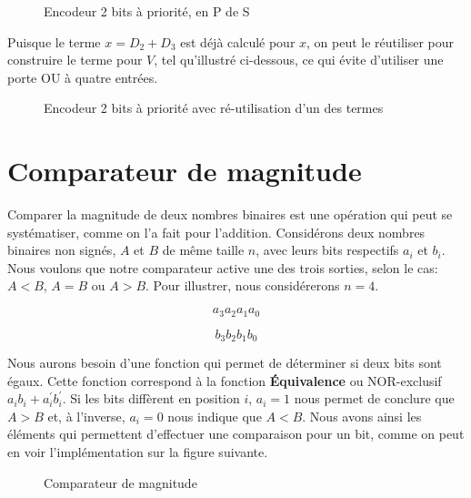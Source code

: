 \documentclass[letter, oneside]{book}
\begin{document}
\begin{enumerate}
\begin{figure}[htbp]
\centering

\caption{\label{fig:org0296f03}Encodeur 2 bits à priorité, en P de S}
\end{figure}

Puisque le terme \(x = D_2 + D_3\) est déjà calculé pour \(x\), on
peut le réutiliser pour construire le terme pour \(V\), tel
qu'illustré ci-dessous, ce qui évite d'utiliser une porte OU à quatre
entrées.

\begin{figure}[htbp]
\centering

\caption{\label{fig:orgd68beb9}Encodeur 2 bits à priorité avec ré-utilisation d'un des termes}
\end{figure}
\end{enumerate}


\section{Comparateur de magnitude}
\label{sec:org3540ce5}

Comparer la magnitude de deux nombres binaires est une opération qui
peut se systématiser, comme on l'a fait pour l'addition. Considérons
deux nombres binaires non signés, \(A\) et \(B\) de même taille \(n\),
avec leurs bits respectifs \(a_i\) et \(b_i\). Nous voulons que notre
comparateur active une des trois sorties, selon le cas: \(A < B\), \(A
= B\) ou \(A > B\). Pour illustrer, nous considérerons \(n = 4\).

$$ a_3 a_2 a_1 a_0 $$

$$ b_3 b_2 b_1 b_0 $$

Nous aurons besoin d'une fonction qui permet de déterminer si deux
bits sont égaux. Cette fonction correspond à la fonction \textbf{Équivalence}
ou NOR-exclusif \(a_i b_i + a_i^\prime b_i^\prime\).  Si les bits
diffèrent en position \(i\), \(a_i = 1\) nous permet de conclure que
\(A > B\) et, à l'inverse, \(a_i = 0\) nous indique que \(A < B\). Nous avons ainsi
les éléments qui permettent d'effectuer une comparaison pour un bit,
comme on peut en voir l'implémentation sur la figure suivante.

\begin{figure}[htbp]
\centering

\caption{\label{fig:orgfce9b5b}Comparateur de magnitude}
\end{figure}
\end{document}
